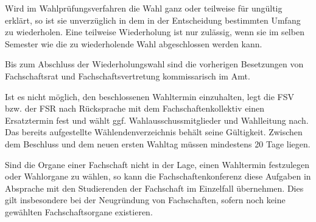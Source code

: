 \documentclass[%
draft,%
multilinesections%
]{fswo}
\begin{document}
\begin{contract}
Wird im Wahlprüfungsverfahren die Wahl ganz oder teilweise für ungültig erklärt, so ist sie unverzüglich in dem in der Entscheidung bestimmten Umfang zu wiederholen.
Eine teilweise Wiederholung ist nur zulässig, wenn sie im selben Semester wie die zu wiederholende Wahl abgeschlossen werden kann.

Bis zum Abschluss der Wiederholungswahl sind die vorherigen Besetzungen von Fachschaftsrat und Fachschaftsvertretung kommissarisch im Amt.

Ist es nicht möglich, den beschlossenen Wahltermin einzuhalten, legt die FSV bzw. der FSR nach Rücksprache mit dem Fachschaftenkollektiv einen Ersatztermin fest und wählt ggf. Wahlausschussmitglieder und Wahlleitung nach.
Das bereits aufgestellte Wählendenverzeichnis behält seine Gültigkeit.
Zwischen dem Beschluss und dem neuen ersten Wahltag müssen mindestens 20 Tage liegen.

Sind die Organe einer Fachschaft nicht in der Lage, einen Wahltermin festzulegen oder Wahlorgane zu wählen, so kann die Fachschaftenkonferenz diese Aufgaben in Absprache mit den Studierenden der Fachschaft im Einzelfall übernehmen.
Dies gilt insbesondere bei der Neugründung von Fachschaften, sofern noch keine gewählten Fachschaftsorgane existieren.
\end{contract}
\end{document}
